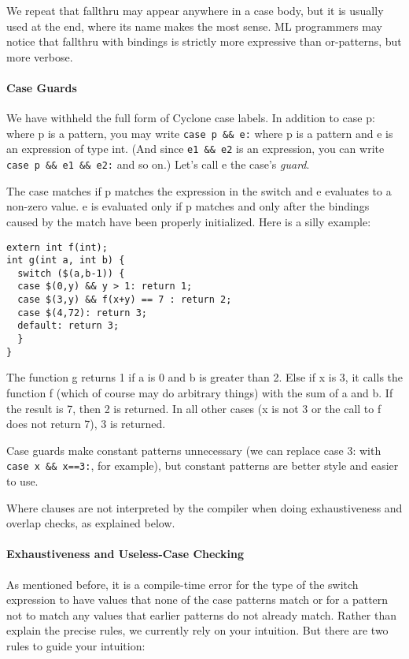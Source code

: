 We repeat that fallthru may appear anywhere in a case body, but it is
usually used at the end, where its name makes the most sense.  ML
programmers may notice that fallthru with bindings is strictly more
expressive than or-patterns, but more verbose.

\paragraph{Case Guards}

We have withheld the full form of Cyclone case labels.  In addition to
case p: where p is a pattern, you may write \texttt{case p \&\& e:} where
p is a pattern and e is an expression of type int.  (And since
\texttt{e1 \&\& e2} is an expression, you can write
\texttt{case p \&\& e1 \&\& e2:} and so on.)  Let's call e the case's
\textit{guard}.


The case matches if p matches the expression in the switch and e
evaluates to a non-zero value.  e is evaluated only if p matches and
only after the bindings caused by the match have been properly
initialized.  Here is a silly example:

\begin{verbatim}
extern int f(int);
int g(int a, int b) {
  switch ($(a,b-1)) {
  case $(0,y) && y > 1: return 1;
  case $(3,y) && f(x+y) == 7 : return 2;
  case $(4,72): return 3;
  default: return 3;
  }
}
\end{verbatim}


The function g returns 1 if a is 0 and b is greater than 2.  Else if x
is 3, it calls the function f (which of course may do arbitrary
things) with the sum of a and b.  If the result is 7, then 2 is
returned.  In all other cases (x is not 3 or the call to f does not
return 7), 3 is returned.


Case guards make constant patterns unnecessary (we can replace case 3:
with \texttt{case x \&\& x==3:}, for example), but constant patterns are
better style and easier to use.


Where clauses are not interpreted by the compiler when doing
exhaustiveness and overlap checks, as explained below.


\paragraph{Exhaustiveness and Useless-Case Checking}

As mentioned before, it is a compile-time error for the type of the
switch expression to have values that none of the case patterns match
or for a pattern not to match any values that earlier patterns do not
already match.  Rather than explain the precise rules, we currently
rely on your intuition.  But there are two rules to guide your
intuition:

